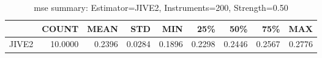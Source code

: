 \begin{table}[ht]
\centering
\caption{mse summary: Estimator=JIVE2, Instruments=200, Strength=0.50}
\begin{tabular}{lrrrrrrrr}
\toprule
 & COUNT & MEAN & STD & MIN & 25\% & 50\% & 75\% & MAX \\
\midrule
JIVE2 & 10.0000 & 0.2396 & 0.0284 & 0.1896 & 0.2298 & 0.2446 & 0.2567 & 0.2776 \\
\bottomrule
\end{tabular}
\end{table}
